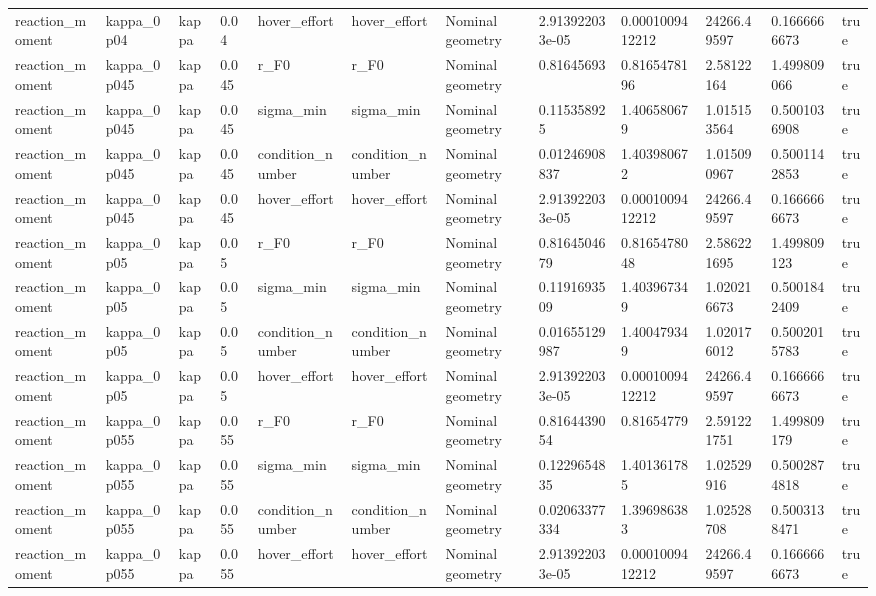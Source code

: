 \begin{tabular}{@{}llllllllllll@{}}
reaction\_moment & kappa\_0p04 & kappa & 0.04 & hover\_effort & hover\_effort & Nominal geometry & 2.913922033e-05 & 0.0001009412212 & 24266.49597 & 0.1666666673 & true \\
reaction\_moment & kappa\_0p045 & kappa & 0.045 & r\_F0 & r\_F0 & Nominal geometry & 0.81645693 & 0.8165478196 & 2.58122164 & 1.499809066 & true \\
reaction\_moment & kappa\_0p045 & kappa & 0.045 & sigma\_min & sigma\_min & Nominal geometry & 0.115358925 & 1.406580679 & 1.015153564 & 0.5001036908 & true \\
reaction\_moment & kappa\_0p045 & kappa & 0.045 & condition\_number & condition\_number & Nominal geometry & 0.01246908837 & 1.403980672 & 1.015090967 & 0.5001142853 & true \\
reaction\_moment & kappa\_0p045 & kappa & 0.045 & hover\_effort & hover\_effort & Nominal geometry & 2.913922033e-05 & 0.0001009412212 & 24266.49597 & 0.1666666673 & true \\
reaction\_moment & kappa\_0p05 & kappa & 0.05 & r\_F0 & r\_F0 & Nominal geometry & 0.8164504679 & 0.8165478048 & 2.586221695 & 1.499809123 & true \\
reaction\_moment & kappa\_0p05 & kappa & 0.05 & sigma\_min & sigma\_min & Nominal geometry & 0.1191693509 & 1.403967349 & 1.020216673 & 0.5001842409 & true \\
reaction\_moment & kappa\_0p05 & kappa & 0.05 & condition\_number & condition\_number & Nominal geometry & 0.01655129987 & 1.400479349 & 1.020176012 & 0.5002015783 & true \\
reaction\_moment & kappa\_0p05 & kappa & 0.05 & hover\_effort & hover\_effort & Nominal geometry & 2.913922033e-05 & 0.0001009412212 & 24266.49597 & 0.1666666673 & true \\
reaction\_moment & kappa\_0p055 & kappa & 0.055 & r\_F0 & r\_F0 & Nominal geometry & 0.8164439054 & 0.81654779 & 2.591221751 & 1.499809179 & true \\
reaction\_moment & kappa\_0p055 & kappa & 0.055 & sigma\_min & sigma\_min & Nominal geometry & 0.1229654835 & 1.401361785 & 1.02529916 & 0.5002874818 & true \\
reaction\_moment & kappa\_0p055 & kappa & 0.055 & condition\_number & condition\_number & Nominal geometry & 0.02063377334 & 1.396986383 & 1.02528708 & 0.5003138471 & true \\
reaction\_moment & kappa\_0p055 & kappa & 0.055 & hover\_effort & hover\_effort & Nominal geometry & 2.913922033e-05 & 0.0001009412212 & 24266.49597 & 0.1666666673 & true \\

\end{tabular}
